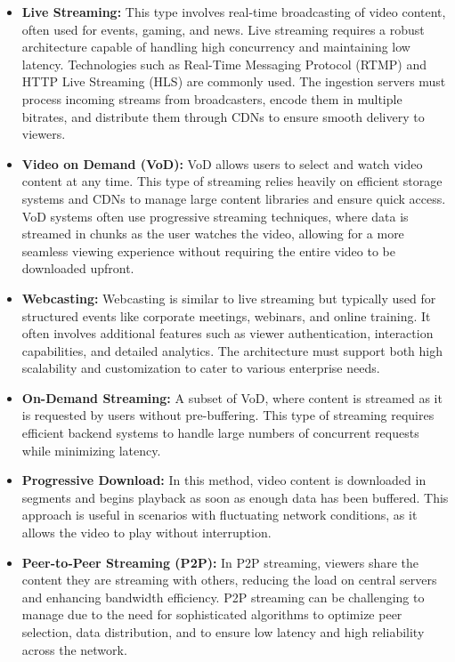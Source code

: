 \begin{itemize}
    \item \textbf{Live Streaming:} This type involves real-time broadcasting of video content, often used for events, gaming, and news. Live streaming requires a robust architecture capable of handling high concurrency and maintaining low latency. Technologies such as Real-Time Messaging Protocol (RTMP) and HTTP Live Streaming (HLS) are commonly used. The ingestion servers must process incoming streams from broadcasters, encode them in multiple bitrates, and distribute them through CDNs to ensure smooth delivery to viewers\cite{rtmp_hls}.
    \item \textbf{Video on Demand (VoD):} VoD allows users to select and watch video content at any time. This type of streaming relies heavily on efficient storage systems and CDNs to manage large content libraries and ensure quick access. VoD systems often use progressive streaming techniques, where data is streamed in chunks as the user watches the video, allowing for a more seamless viewing experience without requiring the entire video to be downloaded upfront\cite{vod_architecture}.
    \item \textbf{Webcasting:} Webcasting is similar to live streaming but typically used for structured events like corporate meetings, webinars, and online training. It often involves additional features such as viewer authentication, interaction capabilities, and detailed analytics. The architecture must support both high scalability and customization to cater to various enterprise needs\cite{webcasting_tech}.
    \item \textbf{On-Demand Streaming:} A subset of VoD, where content is streamed as it is requested by users without pre-buffering. This type of streaming requires efficient backend systems to handle large numbers of concurrent requests while minimizing latency\cite{on_demand_streaming}.
    \item \textbf{Progressive Download:} In this method, video content is downloaded in segments and begins playback as soon as enough data has been buffered. This approach is useful in scenarios with fluctuating network conditions, as it allows the video to play without interruption\cite{progressive_download}.
    \item \textbf{Peer-to-Peer Streaming (P2P):} In P2P streaming, viewers share the content they are streaming with others, reducing the load on central servers and enhancing bandwidth efficiency. P2P streaming can be challenging to manage due to the need for sophisticated algorithms to optimize peer selection, data distribution, and to ensure low latency and high reliability across the network\cite{p2p_streaming}.
\end{itemize}

